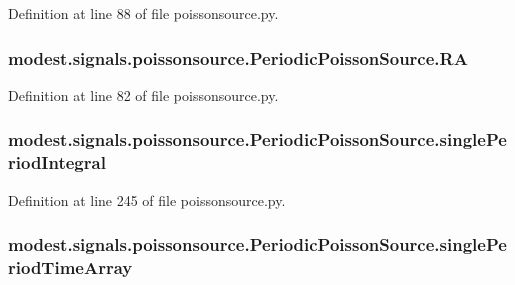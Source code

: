 Definition at line 88 of file poissonsource.\+py.

\subsubsection[{\texorpdfstring{RA}{RA}}]{\setlength{\rightskip}{0pt plus 5cm}modest.\+signals.\+poissonsource.\+Periodic\+Poisson\+Source.\+RA}\hypertarget{classmodest_1_1signals_1_1poissonsource_1_1PeriodicPoissonSource_a90c55d8278f10578bea87ea3547d08df}{}\label{classmodest_1_1signals_1_1poissonsource_1_1PeriodicPoissonSource_a90c55d8278f10578bea87ea3547d08df}


Definition at line 82 of file poissonsource.\+py.

\subsubsection[{\texorpdfstring{single\+Period\+Integral}{singlePeriodIntegral}}]{\setlength{\rightskip}{0pt plus 5cm}modest.\+signals.\+poissonsource.\+Periodic\+Poisson\+Source.\+single\+Period\+Integral}\hypertarget{classmodest_1_1signals_1_1poissonsource_1_1PeriodicPoissonSource_a7ac3284a45a9d165fe8d6b6fe8fd4b0e}{}\label{classmodest_1_1signals_1_1poissonsource_1_1PeriodicPoissonSource_a7ac3284a45a9d165fe8d6b6fe8fd4b0e}


Definition at line 245 of file poissonsource.\+py.

\subsubsection[{\texorpdfstring{single\+Period\+Time\+Array}{singlePeriodTimeArray}}]{\setlength{\rightskip}{0pt plus 5cm}modest.\+signals.\+poissonsource.\+Periodic\+Poisson\+Source.\+single\+Period\+Time\+Array}\hypertarget{classmodest_1_1signals_1_1poissonsource_1_1PeriodicPoissonSource_a0a4a43615a7ba6ad5952ec1f68833b2c}{}\label{classmodest_1_1signals_1_1poissonsource_1_1PeriodicPoissonSource_a0a4a43615a7ba6ad5952ec1f68833b2c}



